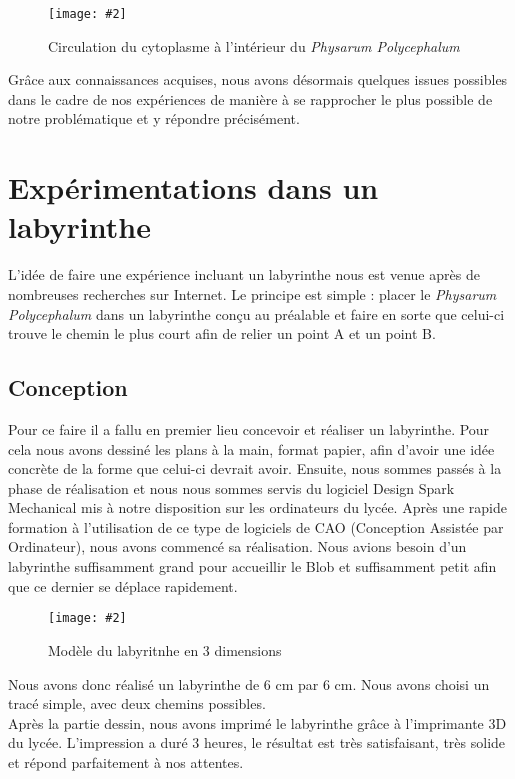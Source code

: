 \documentclass[]{report}
\newcommand{\includeimage}[2][]{%
\imgsrc{#2}
\begin{latexonly}
    \texttt{[image: \#2]}
\end{latexonly}
}
\theoremstyle{definition}
\begin{document}
\begin{figure}[H]
    \centering
    \includeimage[height=5cm]{sang-blob.JPG}
    \caption{Circulation du cytoplasme à l'intérieur du \textit{Physarum Polycephalum}}
\end{figure}

{Grâce aux connaissances acquises, nous avons désormais quelques issues possibles dans le cadre de nos expériences de manière à se rapprocher le plus possible de notre problématique et y répondre précisément.}

\section{Expérimentations dans un labyrinthe}

{L’idée de faire une expérience incluant un labyrinthe nous est venue après de nombreuses recherches sur Internet. Le principe est simple : placer le \textit{Physarum Polycephalum} dans un labyrinthe conçu au préalable et faire en sorte que celui-ci trouve le chemin le plus court afin de relier un point A et un point B.}

\subsection{Conception}

{Pour ce faire il a fallu en premier lieu concevoir et réaliser un labyrinthe. 
Pour cela nous avons dessiné les plans à la main, format papier, afin d’avoir une idée concrète de la forme que celui-ci devrait avoir. Ensuite, nous sommes passés à la phase de réalisation et nous nous sommes servis du logiciel Design Spark Mechanical mis à notre disposition sur les ordinateurs du lycée. Après une rapide formation à l’utilisation de ce type de logiciels de CAO (Conception Assistée par Ordinateur), nous avons commencé sa réalisation. 
Nous avions besoin d’un labyrinthe suffisamment grand pour accueillir le Blob et suffisamment petit afin que ce dernier se déplace rapidement. }

\begin{figure}[H]
    \centering
    \includeimage[height=5cm]{labyrinthe.png}
    \caption{Modèle du labyritnhe en 3 dimensions}
\end{figure}

{Nous avons donc réalisé un labyrinthe de 6 cm par 6 cm. Nous avons choisi un tracé simple, avec deux chemins possibles. }\\
{Après la partie dessin, nous avons imprimé le labyrinthe grâce à l’imprimante 3D du lycée. L’impression a duré 3 heures, le résultat est très satisfaisant, très solide et répond parfaitement à nos attentes. }
\end{document}
